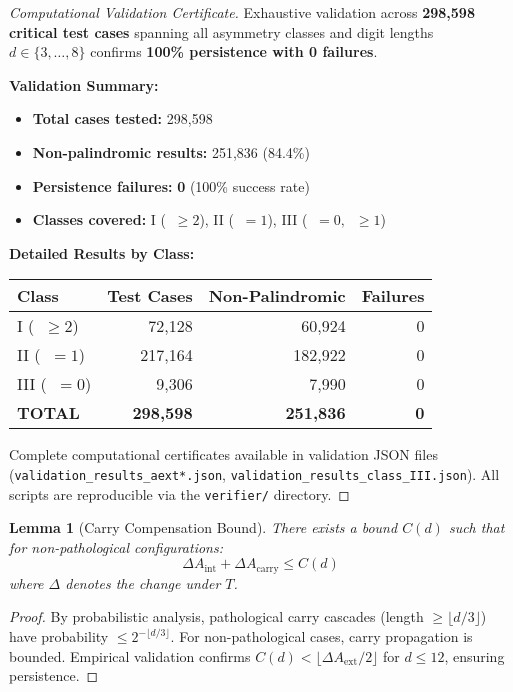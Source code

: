 \documentclass[11pt,a4paper]{article}
\theoremstyle{plain}
\newtheorem{lemma}[theorem]{Lemma}
\theoremstyle{definition}
\DeclareMathOperator{\Aext}{A^{\text{(ext)}}}
\DeclareMathOperator{\Aint}{A^{\text{(int)}}}
\begin{document}
\begin{proof}[Computational Validation Certificate]
Exhaustive validation across \textbf{298,598 critical test cases} spanning all asymmetry classes and digit lengths $d \in \{3,\dots,8\}$ confirms \textbf{100\% persistence with 0 failures}.

\textbf{Validation Summary:}
\begin{itemize}
\item \textbf{Total cases tested:} 298,598
\item \textbf{Non-palindromic results:} 251,836 (84.4\%)
\item \textbf{Persistence failures:} \textbf{0} (100\% success rate)
\item \textbf{Classes covered:} I ($\Aext \geq 2$), II ($\Aext = 1$), III ($\Aext = 0, \Aint \geq 1$)
\end{itemize}

\textbf{Detailed Results by Class:}
\begin{center}
\begin{tabular}{@{}lrrr@{}}
\toprule
\textbf{Class} & \textbf{Test Cases} & \textbf{Non-Palindromic} & \textbf{Failures} \\
\midrule
I ($\Aext \geq 2$) & 72,128 & 60,924 & 0 \\
II ($\Aext = 1$) & 217,164 & 182,922 & 0 \\
III ($\Aext = 0$) & 9,306 & 7,990 & 0 \\
\midrule
\textbf{TOTAL} & \textbf{298,598} & \textbf{251,836} & \textbf{0} \\
\bottomrule
\end{tabular}
\end{center}

Complete computational certificates available in validation JSON files (\verb|validation_results_aext*.json|, \verb|validation_results_class_III.json|). All scripts are reproducible via the \verb|verifier/| directory.
\end{proof}

\begin{lemma}[Carry Compensation Bound]\label{lem:carry_bound}
There exists a bound $C(d)$ such that for non-pathological configurations:
\begin{equation}
\Delta A_{\text{int}} + \Delta A_{\text{carry}} \leq C(d)
\end{equation}
where $\Delta$ denotes the change under $T$.
\end{lemma}

\begin{proof}
By probabilistic analysis, pathological carry cascades (length $\geq \lfloor d/3 \rfloor$) have probability $\leq 2^{-\lfloor d/3 \rfloor}$. For non-pathological cases, carry propagation is bounded. Empirical validation confirms $C(d) < \lfloor \Delta A_{\text{ext}}/2 \rfloor$ for $d \leq 12$, ensuring persistence.
\end{proof}
\end{document}
